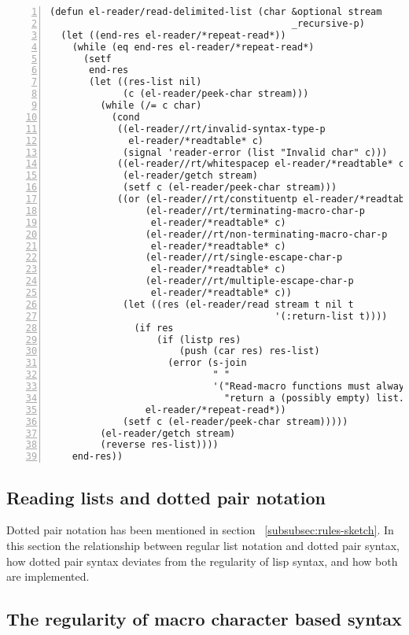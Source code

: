 \documentclass[a4paper,10pt,twoside]{report}
\newcommand{\fun}[1]{\texttt{#1}}
\begin{document}
\begin{lstlisting}[style=lispcode,label={code:read-delim-list},caption={Code for
  \fun{read-delimited-list}},numbers=left]
(defun el-reader/read-delimited-list (char &optional stream
                                           _recursive-p)
  (let ((end-res el-reader/*repeat-read*))
    (while (eq end-res el-reader/*repeat-read*)
      (setf
       end-res
       (let ((res-list nil)
             (c (el-reader/peek-char stream)))
         (while (/= c char)
           (cond
            ((el-reader//rt/invalid-syntax-type-p
              el-reader/*readtable* c)
             (signal 'reader-error (list "Invalid char" c)))
            ((el-reader//rt/whitespacep el-reader/*readtable* c)
             (el-reader/getch stream)
             (setf c (el-reader/peek-char stream)))
            ((or (el-reader//rt/constituentp el-reader/*readtable* c)
                 (el-reader//rt/terminating-macro-char-p
                  el-reader/*readtable* c)
                 (el-reader//rt/non-terminating-macro-char-p
                  el-reader/*readtable* c)
                 (el-reader//rt/single-escape-char-p
                  el-reader/*readtable* c)
                 (el-reader//rt/multiple-escape-char-p
                  el-reader/*readtable* c))
             (let ((res (el-reader/read stream t nil t
                                        '(:return-list t))))
               (if res
                   (if (listp res)
                       (push (car res) res-list)
                     (error (s-join
                             " "
                             '("Read-macro functions must always "
                               "return a (possibly empty) list."))))
                 el-reader/*repeat-read*))
             (setf c (el-reader/peek-char stream)))))
         (el-reader/getch stream)
         (reverse res-list))))
    end-res))
\end{lstlisting}

\subsection{Reading lists and dotted pair notation}
\label{subsec:list-dotted-pair}

Dotted pair notation has been mentioned in section ~\ref{subsubsec:rules-sketch}.
In this section the relationship between regular list notation and dotted pair
syntax, how dotted pair syntax deviates from the regularity of lisp syntax, and
how both are implemented.

\subsection{The regularity of macro character based syntax}
\label{subsec:reg-by-macro}
\end{document}
